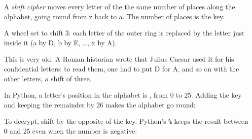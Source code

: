 \begin{definition}\label{def:g9:first-cryptography:shift-cipher}
A \emph{shift cipher} moves every letter of the 
the same number of places along the alphabet, going round from z back to a. The
number of places is the key.
\end{definition}

\begin{omfigure}

{\small A  wheel set to shift 3: each letter of the outer ring is replaced
by the letter just inside it (a by D, b by E, \ldots, x by A).}
\end{omfigure}

This  is very old. A Roman historian wrote that Julius Caesar used it for
his confidential letters: to read them, one had to put D for A, and so on with
the other letters, a shift of three.

In Python, a letter's position in the alphabet is ,
from 0 to 25. Adding the key and keeping the remainder by 26 makes the
alphabet go round:

\label{lst:g9:first-cryptography:shift}

\label{out:g9:first-cryptography:shift}

To decrypt, shift by the opposite of the key. Python's \texttt{\%} keeps the
result between 0 and 25 even when the number is negative:

